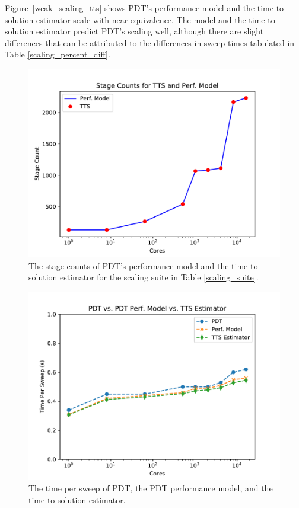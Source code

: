 Figure~\ref{weak_scaling_tts} shows PDT's performance model and the time-to-solution estimator scale with near equivalence. The model and the time-to-solution estimator predict PDT's scaling well, although there are slight differences that can be attributed to the differences in sweep times tabulated in Table \ref{scaling_percent_diff}.
\begin{figure}[ht]
\centering
\includegraphics[scale=0.8]{../../figures/scaling_stagecount.pdf}
\caption{The stage counts of PDT's performance model and the time-to-solution estimator for the scaling suite in Table \ref{scaling_suite}.}
\label{scaling_stagecount}
\end{figure}
\begin{figure}[ht]
\centering
\includegraphics[scale=0.8]{../../figures/scaling_tts_sweep_times.pdf}
\caption{The time per sweep of PDT, the PDT performance model, and the time-to-solution estimator.}
\label{weak_scaling_tts_sweep}
\end{figure}
